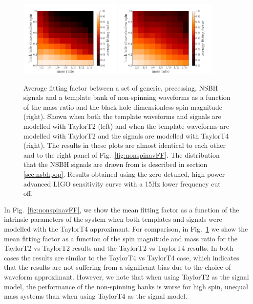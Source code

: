\begin{figure}
    \centering
    \begin{minipage}[l]{\columnwidth}
    \centering
\includegraphics[width=0.45\textwidth]
{papers/nsbh_effectualness/figure9A.pdf}
\includegraphics[width=0.45\textwidth]
{papers/nsbh_effectualness/figure9B.pdf}
\caption{\label{fig:nonspinavFFT2}
Average fitting factor between a set of generic, precessing, NSBH signals and a
template bank of non-spinning waveforms as a function of the mass ratio and the
black hole dimensionless spin
magnitude (right). Shown when both the
template waveforms and signals are modelled with TaylorT2 (left) and when the
template waveforms are modelled with TaylorT2 and the signals are modelled with
TaylorT4 (right). The results in these plots are almost identical to each other 
and to the right panel of Fig.~\ref{fig:nonspinavFF}.
The distribution that the NSBH
signals are drawn from is described in section \ref{sec:nsbhpop}.
Results obtained
using the zero-detuned, high-power advanced LIGO sensitivity curve with a 15Hz
lower frequency cut off.
}
\end{minipage}
\end{figure}

In Fig.~\ref{fig:nonspinavFF}, we show the mean fitting factor as a function
of the intrinsic parameters of the system when both templates and signals
were modelled with the TaylorT4 approximant. For comparison, in
Fig.~\ref{fig:nonspinavFFT2} we show the mean fitting factor as a function of
the spin magnitude and mass ratio for the TaylorT2 vs TaylorT2 results and the
TaylorT2 vs TaylorT4 results. In both cases the results are similar to the
TaylorT4 vs TaylorT4 case, which indicates that the results are not suffering
from a significant bias due to the choice of waveform approximant. However, we
note that when using TaylorT2 as the signal model, the performance of the
non-spinning banks is worse for high spin, unequal mass systems than when
using TaylorT4 as the signal model.

